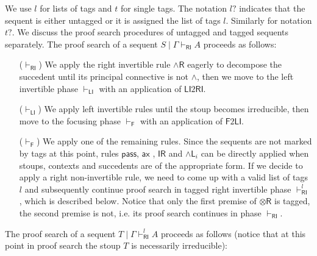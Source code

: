 \documentclass[submission,copyright,creativecommons]{eptcs}
\theoremstyle{definition}
\newcommand{\tr}{\otimes \mathsf{R}}
\newcommand{\pass}{\mathsf{pass}}
\newcommand{\unitr}{\mathsf{IR}}
\newcommand{\andli}{\land \mathsf{L}_{i}}
\newcommand{\andr}{\land \mathsf{R}}
\newcommand{\ax}{\mathsf{ax}}
\newcommand{\RI}{\mathsf{RI}}
\newcommand{\LI}{\mathsf{LI}}
\newcommand{\Pass}{\mathsf{P}}
\newcommand{\F}{\mathsf{F}}
\begin{document}
We use $l$ for lists of tags and $t$ for single tags.
The notation $l?$ indicates that the sequent is either untagged or it is assigned the list of tags $l$. Similarly for notation $t?$.
We discuss the proof search procedures of untagged and tagged sequents separately.
The proof search of a sequent $S \mid \Gamma \vdash_\RI A$ proceeds as follows:
\begin{itemize}
  \item[($\vdash_{\RI}$)] We apply the right invertible rule $\andr$ eagerly to decompose the succedent until its principal connective is not $\land$, then we move to the left invertible phase $\vdash_\LI$ with an application of $\LI 2 \RI$.
  \item[($\vdash_{\LI}$)] We apply left invertible rules until the stoup becomes irreducible, then move to the focusing phase $\vdash_\F$ with an application of $\F 2 \LI$.
  \item[($\vdash_{\F}$)] We apply one of the remaining rules. Since the sequents are not marked by tags at this point, rules $\pass$, $\ax$ , $\unitr$ and $\andli$ can be directly applied when stoups, contexts and succedents are of the appropriate form.
  If we decide to apply a right non-invertible rule, we need to come up with a valid list of tags $l$ and subsequently continue proof search in tagged right invertible phase $\vdash^{l}_{\RI}$, which is described below. Notice that only the first premise of $\tr$ is tagged, the second premise is not, i.e. its proof search continues in phase $\vdash_{\RI}$.
\end{itemize}
The proof search of a sequent $T \mid \Gamma \vdash^{l}_\RI A$ proceeds as follows (notice that at this point in proof search the stoup $T$ is necessarily irreducible):
\end{document}
